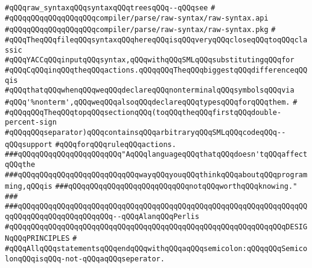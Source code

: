 \verb|#qQQqraw_syntaxqQQqsyntaxqQQqtreesqQQq--qQQqsee|\newline
\verb|#|\newline
\verb|#qQQqqQQqqQQqqQQqqQQqcompiler/parse/raw-syntax/raw-syntax.api|\newline
\verb|#qQQqqQQqqQQqqQQqqQQqcompiler/parse/raw-syntax/raw-syntax.pkg|\newline
\verb|#|\newline
\verb|#qQQqTheqQQqfileqQQqsyntaxqQQqhereqQQqisqQQqveryqQQqcloseqQQqtoqQQqclassic|\newline
\verb|#qQQqYACCqQQqinputqQQqsyntax,qQQqwithqQQqSMLqQQqsubstitutingqQQqfor|\newline
\verb|#qQQqCqQQqinqQQqtheqQQqactions.qQQqqQQqTheqQQqbiggestqQQqdifferenceqQQqis|\newline
\verb|#qQQqthatqQQqwhenqQQqweqQQqdeclareqQQqnonterminalqQQqsymbolsqQQqvia|\newline
\verb|#qQQq'%nonterm',qQQqweqQQqalsoqQQqdeclareqQQqtypesqQQqforqQQqthem.|\newline
\verb|#|\newline
\verb|#qQQqqQQqTheqQQqtopqQQqsectionqQQq(toqQQqtheqQQqfirstqQQqdouble-percent-sign|\newline
\verb|#qQQqqQQqseparator)qQQqcontainsqQQqarbitraryqQQqSMLqQQqcodeqQQq--qQQqsupport|\newline
\verb|#qQQqforqQQqruleqQQqactions.|\newline
\newline
\newline
\newline
\verb|###qQQqqQQqqQQqqQQqqQQqqQQq"AqQQqlanguageqQQqthatqQQqdoesn'tqQQqaffectqQQqthe|\newline
\verb|###qQQqqQQqqQQqqQQqqQQqqQQqqQQqwayqQQqyouqQQqthinkqQQqaboutqQQqprogramming,qQQqis|\newline
\verb|###qQQqqQQqqQQqqQQqqQQqqQQqqQQqnotqQQqworthqQQqknowing."|\newline
\verb|###|\newline
\verb|###qQQqqQQqqQQqqQQqqQQqqQQqqQQqqQQqqQQqqQQqqQQqqQQqqQQqqQQqqQQqqQQqqQQqqQQqqQQqqQQqqQQqqQQqqQQq--qQQqAlanqQQqPerlis|\newline
\newline
\newline
\verb|#qQQqqQQqqQQqqQQqqQQqqQQqqQQqqQQqqQQqqQQqqQQqqQQqqQQqqQQqqQQqqQQqDESIGNqQQqPRINCIPLES|\newline
\verb|#|\newline
\verb|#qQQqAllqQQqstatementsqQQqendqQQqwithqQQqaqQQqsemicolon:qQQqqQQqSemicolonqQQqisqQQq-not-qQQqaqQQqseperator.|\newline
